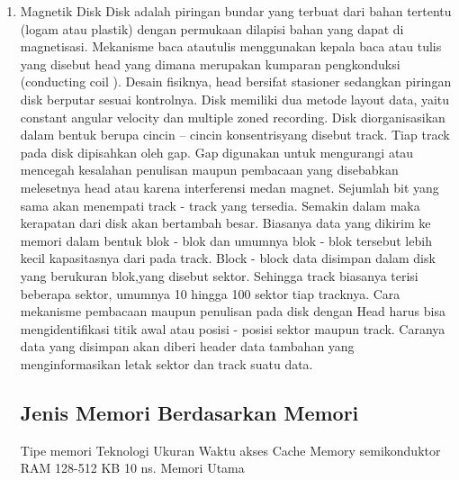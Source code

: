 \documentclass{article}
\begin{document}
\begin{enumerate}
\item Magnetik Disk  Disk adalah piringan bundar yang terbuat dari bahan tertentu (logam atau plastik) dengan permukaan dilapisi bahan yang dapat di magnetisasi. Mekanisme baca atautulis menggunakan kepala baca atau tulis yang disebut head yang dimana merupakan kumparan pengkonduksi (conducting coil ). Desain fisiknya, head bersifat stasioner sedangkan piringan disk berputar sesuai kontrolnya. Disk memiliki dua metode layout data, yaitu  constant angular velocity dan multiple zoned recording. Disk diorganisasikan dalam bentuk berupa cincin – cincin
konsentrisyang disebut track. Tiap track pada disk dipisahkan oleh gap. Gap digunakan untuk mengurangi atau mencegah kesalahan penulisan maupun pembacaan yang disebabkan melesetnya head atau karena interferensi medan magnet. Sejumlah bit yang sama akan menempati track - track yang tersedia. Semakin dalam maka kerapatan dari disk akan bertambah besar. Biasanya data yang dikirim ke memori dalam bentuk blok - blok dan umumnya blok - blok tersebut lebih kecil kapasitasnya dari pada track. Block - block data disimpan dalam disk yang berukuran blok,yang disebut sektor. Sehingga track biasanya terisi beberapa sektor, umumnya 10 hingga 100 sektor tiap tracknya. Cara mekanisme pembacaan maupun penulisan pada disk dengan Head harus bisa mengidentifikasi titik awal atau posisi - posisi sektor maupun track. Caranya data yang disimpan akan diberi header data tambahan yang menginformasikan letak sektor dan track suatu data.  


\subsection {Jenis Memori Berdasarkan Memori}

 
Tipe memori Teknologi Ukuran Waktu akses Cache Memory semikonduktor RAM 128-512 KB 10 ns. Memori Utama 













\end{enumerate}
\end{document}
